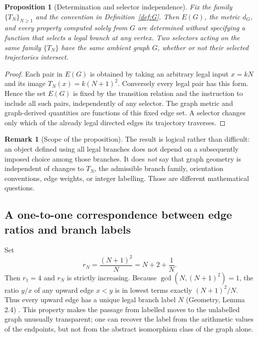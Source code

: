 \documentclass[11pt,a4paper]{article}
\newtheorem{proposition}[theorem]{Proposition}
\theoremstyle{definition}\newtheorem{definition}[theorem]{Definition}
\newtheorem{remark}[theorem]{Remark}
\begin{document}
\begin{proposition}[Determination and selector independence]\label{prop:selectorfree}
Fix the family $\{T_N\}_{N\ge1}$ and the convention in Definition~\ref{def:G}. Then $E(G)$, the metric $d_G$, and every property computed solely from $G$ are determined without specifying a function that selects a legal branch at any vertex. Two selectors acting on the same family $\{T_N\}$ have the same ambient graph $G$, whether or not their selected trajectories intersect.
\end{proposition}
\begin{proof}
Each pair in $E(G)$ is obtained by taking an arbitrary legal input $x=kN$ and its image $T_N(x)=k(N+1)^2$. Conversely every legal pair has this form. Hence the set $E(G)$ is fixed by the transition relation and the instruction to include all such pairs, independently of any selector. The graph metric and graph-derived quantities are functions of this fixed edge set. A selector changes only which of the already legal directed edges its trajectory traverses.
\end{proof}

\begin{remark}[Scope of the proposition]
The result is logical rather than difficult: an object defined using all legal branches does not depend on a subsequently imposed choice among those branches. It does \emph{not} say that graph geometry is independent of changes to $T_N$, the admissible branch family, orientation conventions, edge weights, or integer labelling. Those are different mathematical questions.
\end{remark}

\subsection{A one-to-one correspondence between edge ratios and branch labels}
Set
\begin{equation}\label{eq:rN}
r_N=\frac{(N+1)^2}{N}=N+2+\frac1N.
\end{equation}
Then $r_1=4$ and $r_N$ is strictly increasing. Because $\gcd(N,(N+1)^2)=1$, the ratio $y/x$ of any upward edge $x<y$ is in lowest terms exactly $(N+1)^2/N$. Thus every upward edge has a unique legal branch label $N$ (Geometry, Lemma 2.4) \cite{geometry}. This property makes the passage from labelled moves to the unlabelled graph unusually transparent; one can recover the label from the arithmetic values of the endpoints, but not from the abstract isomorphism class of the graph alone.
\end{document}
